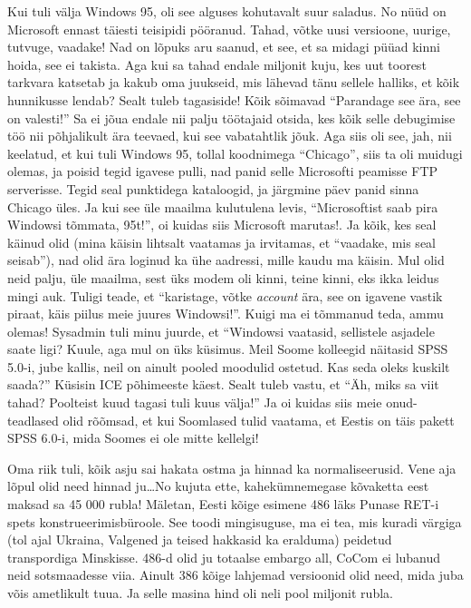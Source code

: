 Kui tuli välja Windows 95, oli see alguses kohutavalt suur saladus. No nüüd on Microsoft ennast täiesti teisipidi pööranud. Tahad, võtke uusi versioone, uurige, tutvuge, vaadake! Nad on lõpuks aru saanud, et see, et sa midagi püüad kinni hoida, see ei takista. Aga kui sa tahad endale miljonit kuju, kes uut toorest tarkvara katsetab ja kakub oma juukseid, mis lähevad tänu sellele halliks, et kõik hunnikusse lendab? Sealt tuleb tagasiside! Kõik sõimavad \enquote{Parandage see ära, see on valesti!} Sa ei jõua endale nii palju töötajaid otsida, kes  kõik selle debugimise töö nii põhjalikult ära teevaed, kui see vabatahtlik jõuk. Aga siis oli see, jah, nii keelatud, et kui tuli Windows 95, tollal koodnimega \enquote{Chicago}, siis ta oli muidugi olemas, ja poisid tegid igavese pulli, nad panid selle Microsofti peamisse FTP serverisse. Tegid seal punktidega kataloogid, ja järgmine päev panid sinna Chicago üles. Ja kui see üle  maailma kulutulena levis, \enquote{Microsoftist saab pira Windowsi tõmmata, 95t!}, oi kuidas siis Microsoft marutas!. Ja kõik, kes seal käinud olid (mina käisin lihtsalt vaatamas ja irvitamas,  et \enquote{vaadake, mis seal seisab}), nad olid ära loginud ka ühe  aadressi, mille kaudu ma käisin. Mul olid neid palju, üle maailma, sest üks modem oli kinni, teine kinni, eks ikka leidus mingi auk. Tuligi teade, et \enquote{karistage, võtke \emph{account} ära, see on igavene vastik piraat, käis piilus meie juures Windowsi!}. Kuigi ma ei tõmmanud teda, ammu olemas! Sysadmin tuli minu juurde, et \enquote{Windowsi vaatasid, sellistele asjadele saate ligi? Kuule, aga mul on üks küsimus. Meil Soome kolleegid näitasid SPSS  5.0-i, jube kallis, neil on ainult pooled moodulid ostetud. Kas seda oleks kuskilt saada?} Küsisin ICE põhimeeste käest. Sealt tuleb vastu, et \enquote{Äh, miks sa viit tahad? Poolteist kuud tagasi tuli kuus välja!} Ja oi kuidas siis meie onud-teadlased olid rõõmsad, et kui Soomlased tulid vaatama, et Eestis on täis pakett SPSS 6.0-i, mida Soomes ei ole mitte kellelgi! 

Oma riik tuli, kõik asju sai hakata ostma ja hinnad ka normaliseerusid. Vene aja lõpul olid need hinnad ju\ldots No kujuta ette, kahekümnemegase kõvaketta eest maksad sa 45 000 rubla! Mäletan, Eesti kõige esimene 486 läks Punase RET-i spets konstrueerimisbüroole. See toodi mingisuguse, ma ei tea, mis kuradi värgiga (tol ajal Ukraina, Valgened ja teised hakkasid ka eralduma)  peidetud transpordiga Minskisse. 486-d olid ju totaalse embargo all, CoCom ei lubanud neid sotsmaadesse viia. Ainult 386 kõige lahjemad versioonid olid need, mida juba võis ametlikult tuua. Ja selle masina hind oli neli pool miljonit rubla.


